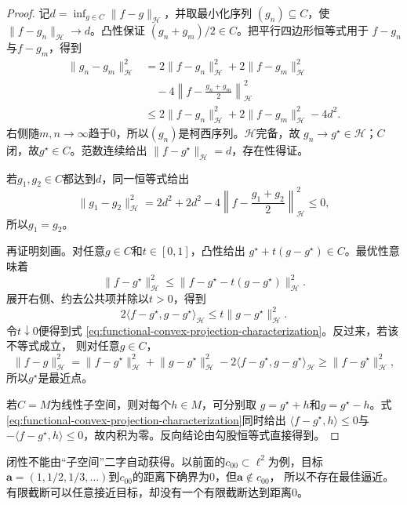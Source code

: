 \begin{proof}
记$d=\inf_{g\in C}\lVert f-g\rVert_{\mathcal{H}}$，并取最小化序列
$(g_n)\subseteq C$，使$\lVert f-g_n\rVert_{\mathcal{H}}\to d$。凸性保证
$(g_n+g_m)/2\in C$。把平行四边形恒等式用于
$f-g_n$与$f-g_m$，得到
\begin{align*}
  \lVert g_n-g_m\rVert_{\mathcal{H}}^2
  &=
  2\lVert f-g_n\rVert_{\mathcal{H}}^2
  +2\lVert f-g_m\rVert_{\mathcal{H}}^2\\
  &\quad
  -4\left\lVert
    f-\frac{g_n+g_m}{2}
  \right\rVert_{\mathcal{H}}^2\\
  &\leq
  2\lVert f-g_n\rVert_{\mathcal{H}}^2
  +2\lVert f-g_m\rVert_{\mathcal{H}}^2-4d^2.
\end{align*}
右侧随$m,n\to\infty$趋于$0$，所以$(g_n)$是柯西序列。$\mathcal{H}$完备，故
$g_n\to g^\star\in\mathcal{H}$；$C$闭，故$g^\star\in C$。范数连续给出
$\lVert f-g^\star\rVert_{\mathcal{H}}=d$，存在性得证。

若$g_1,g_2\in C$都达到$d$，同一恒等式给出
\[
  \lVert g_1-g_2\rVert_{\mathcal{H}}^2
  =
  2d^2+2d^2
  -4\left\lVert f-\frac{g_1+g_2}{2}\right\rVert_{\mathcal{H}}^2
  \leq0,
\]
所以$g_1=g_2$。

再证明刻画。对任意$g\in C$和$t\in[0,1]$，凸性给出
$g^\star+t(g-g^\star)\in C$。最优性意味着
\[
  \lVert f-g^\star\rVert_{\mathcal{H}}^2
  \leq
  \lVert f-g^\star-t(g-g^\star)\rVert_{\mathcal{H}}^2.
\]
展开右侧、约去公共项并除以$t>0$，得到
\[
  2\langle f-g^\star,g-g^\star\rangle_{\mathcal{H}}
  \leq t\lVert g-g^\star\rVert_{\mathcal{H}}^2.
\]
令$t\downarrow0$便得到式
\eqref{eq:functional-convex-projection-characterization}。反过来，若该不等式成立，
则对任意$g\in C$，
\[
  \lVert f-g\rVert_{\mathcal{H}}^2
  =
  \lVert f-g^\star\rVert_{\mathcal{H}}^2
  +\lVert g-g^\star\rVert_{\mathcal{H}}^2
  -2\langle f-g^\star,g-g^\star\rangle_{\mathcal{H}}
  \geq
  \lVert f-g^\star\rVert_{\mathcal{H}}^2,
\]
所以$g^\star$是最近点。

若$C=M$为线性子空间，则对每个$h\in M$，可分别取
$g=g^\star+h$和$g=g^\star-h$。式
\eqref{eq:functional-convex-projection-characterization}同时给出
$\langle f-g^\star,h\rangle\leq0$与
$-\langle f-g^\star,h\rangle\leq0$，故内积为零。反向结论由勾股恒等式直接得到。
\end{proof}

闭性不能由“子空间”二字自动获得。以前面的$c_{00}\subset\ell^2$为例，目标
$\bm{a}=(1,1/2,1/3,\ldots)$到$c_{00}$的距离下确界为$0$，但$\bm{a}\notin c_{00}$，
所以不存在最佳逼近。有限截断可以任意接近目标，却没有一个有限截断达到距离$0$。


